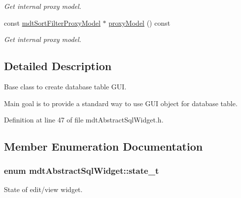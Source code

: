 \begin{DoxyCompactItemize}
\begin{DoxyCompactList}\small\item\em Get internal proxy model. \end{DoxyCompactList}\item 
const \hyperlink{classmdt_sort_filter_proxy_model}{mdt\-Sort\-Filter\-Proxy\-Model} $\ast$ \hyperlink{classmdt_abstract_sql_widget_ac3b54b54289e7366c5fa80091c0d48b4}{proxy\-Model} () const 
\begin{DoxyCompactList}\small\item\em Get internal proxy model. \end{DoxyCompactList}\end{DoxyCompactItemize}


\subsection{Detailed Description}
Base class to create database table G\-U\-I. 

Main goal is to provide a standard way to use G\-U\-I object for database table. 

Definition at line 47 of file mdt\-Abstract\-Sql\-Widget.\-h.



\subsection{Member Enumeration Documentation}
\hypertarget{classmdt_abstract_sql_widget_a54e6a7f2b41fb3edfa1e4ed62abf4072}{
\subsubsection[{state\-\_\-t}]{\setlength{\rightskip}{0pt plus 5cm}enum {\bf mdt\-Abstract\-Sql\-Widget\-::state\-\_\-t}}}\label{classmdt_abstract_sql_widget_a54e6a7f2b41fb3edfa1e4ed62abf4072}


State of edit/view widget. 

